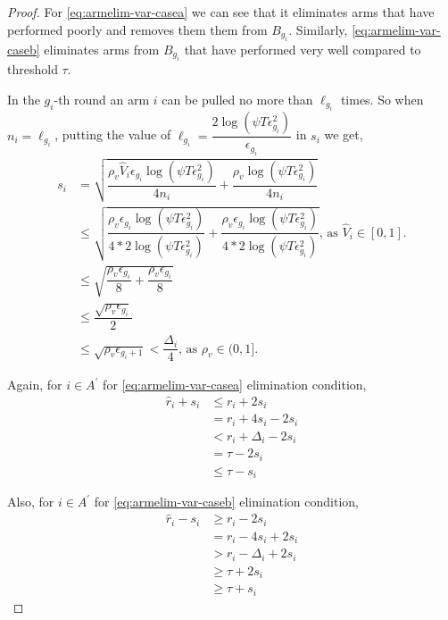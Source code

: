 \begin{proof}
For \ref{eq:armelim-var-casea} we can see that it eliminates arms that have performed poorly and removes them them from $B_{g_{i}}$. Similarly, \ref{eq:armelim-var-caseb} eliminates arms from $B_{g_{i}}$ that have performed very well compared to threshold $\tau$.


In the $g_{i}$-th round an arm $i$ can be pulled no more than $\ell_{g_{i}}$ times. So when $n_{i}=\ell_{g_{i}}$, putting the value of $\ell_{g_{i}}=\dfrac{2\log{(\psi T\epsilon_{g_{i}}^{2})}}{\epsilon_{g_{i}}}$ in $s_{i}$ we get, 
\begin{align*}
s_{i}&=\sqrt{\dfrac{\rho_v \hat{V}_{i} \epsilon_{g_{i}}\log (\psi T\epsilon_{g_{i}}^{2})}{4 n_{i}} + \dfrac{\rho_v \log{(\psi T\epsilon_{g_{i}}^{2})}}{4 n_{i}}} \\
&\leq \sqrt{\dfrac{\rho_v \epsilon_{g_{i}}\log (\psi T\epsilon_{g_{i}}^{2})}{4*2 \log(\psi T\epsilon_{g_{i}}^{2})} + \dfrac{\rho_v \epsilon_{g_{i}} \log{(\psi T\epsilon_{g_{i}}^{2})}}{4*2 \log(\psi T\epsilon_{g_{i}}^{2})} } \text{, as }\hat{V}_{i}\in [0,1].\\
& \leq \sqrt{\dfrac{\rho_v \epsilon_{g_{i}}}{8} + \dfrac{\rho_v \epsilon_{g_{i}}}{8} }\\
& \leq \dfrac{\sqrt{\rho_v \epsilon_{g_{i}}}}{2}\\
& \leq \sqrt{\rho_v \epsilon_{g_{i}+1}} < \dfrac{\Delta_{i}}{4} \text{, as }\rho_v\in (0,1].
\end{align*}

Again, for ${i} \in A^{'}$ for \ref{eq:armelim-var-casea} elimination condition, 
\begin{align*}
\hat{r}_{i} + s_{i}&\leq r_{i} + 2s_{i} \\
&= r_{i} + 4s_{i} - 2s_{i} \\
&< r_{i} + \Delta_{i} - 2s_{i}\\
&= \tau -2s_{i} \\
&\leq \tau - s_{i}
\end{align*}

Also, for ${i} \in A^{'}$ for \ref{eq:armelim-var-caseb} elimination condition, 
\begin{align*}
\hat{r}_{i} - s_{i}&\geq r_{i} - 2s_{i} \\
&= r_{i} - 4s_{i} + 2s_{i} \\
&> r_{i} - \Delta_{i} + 2s_{i}\\
&\geq \tau + 2s_{i} \\
&\geq \tau + s_{i}
\end{align*}


\end{proof}
